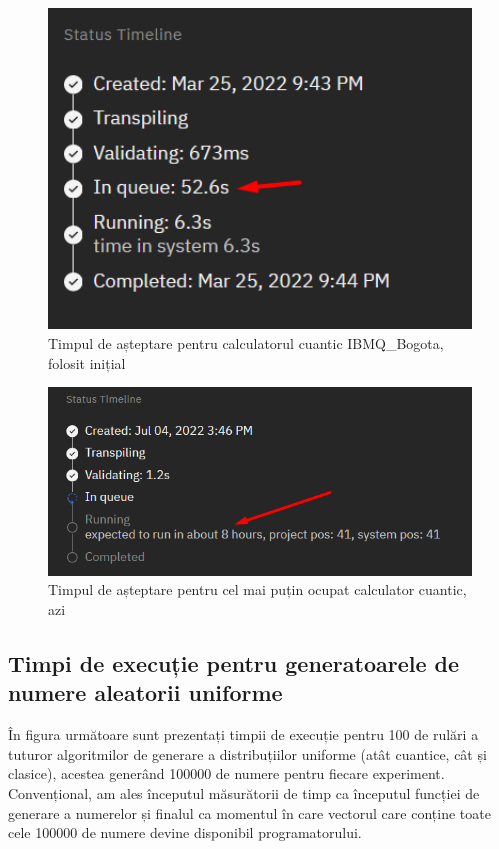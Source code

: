 \begin{figure}[H]
    \centering
    \includegraphics[width=1.0\textwidth]{continut/capitol4/figuri/WaitTime1.png}
    \caption{Timpul de așteptare pentru calculatorul cuantic IBMQ\_Bogota, folosit inițial}
    \label{fig:WaitTime1}
\end{figure}

\begin{figure}[H]
    \centering
    \includegraphics[width=1.0\textwidth]{continut/capitol4/figuri/WaitTime2.png}
    \caption{Timpul de așteptare pentru cel mai puțin ocupat calculator cuantic, azi}
    \label{fig:WaitTime2}
\end{figure}

\subsection{Timpi de execuție pentru generatoarele de numere aleatorii uniforme}

În figura următoare sunt prezentați timpii de execuție pentru 100 de rulări a tuturor algoritmilor de generare a distribuțiilor uniforme (atât cuantice, cât și clasice), acestea generând 100000 de numere pentru fiecare experiment. Convențional, am ales începutul măsurătorii de timp ca începutul funcției de generare a numerelor și finalul ca momentul în care vectorul care conține toate cele 100000 de numere devine disponibil programatorului.

